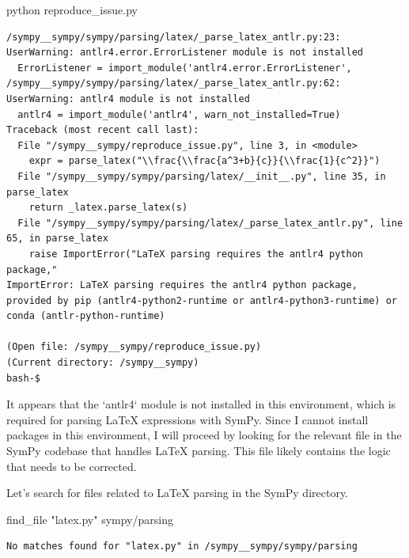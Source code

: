 {\begin{agentbox}
\hrulefill
\begin{CodeVerbatim}[breaklines=true, breakanywhere=true]
python reproduce_issue.py
\end{CodeVerbatim}
\end{agentbox}
\begin{observationbox}\begin{Verbatim}[breaklines=true, breakanywhere=true]
/sympy__sympy/sympy/parsing/latex/_parse_latex_antlr.py:23: UserWarning: antlr4.error.ErrorListener module is not installed
  ErrorListener = import_module('antlr4.error.ErrorListener',
/sympy__sympy/sympy/parsing/latex/_parse_latex_antlr.py:62: UserWarning: antlr4 module is not installed
  antlr4 = import_module('antlr4', warn_not_installed=True)
Traceback (most recent call last):
  File "/sympy__sympy/reproduce_issue.py", line 3, in <module>
    expr = parse_latex("\\frac{\\frac{a^3+b}{c}}{\\frac{1}{c^2}}")
  File "/sympy__sympy/sympy/parsing/latex/__init__.py", line 35, in parse_latex
    return _latex.parse_latex(s)
  File "/sympy__sympy/sympy/parsing/latex/_parse_latex_antlr.py", line 65, in parse_latex
    raise ImportError("LaTeX parsing requires the antlr4 python package,"
ImportError: LaTeX parsing requires the antlr4 python package, provided by pip (antlr4-python2-runtime or antlr4-python3-runtime) or conda (antlr-python-runtime)

(Open file: /sympy__sympy/reproduce_issue.py)
(Current directory: /sympy__sympy)
bash-$
\end{Verbatim}
\end{observationbox}
\begin{agentbox}
It appears that the `antlr4` module is not installed in this environment, which is required for parsing LaTeX expressions with SymPy. Since I cannot install packages in this environment, I will proceed by looking for the relevant file in the SymPy codebase that handles LaTeX parsing. This file likely contains the logic that needs to be corrected.



Let's search for files related to LaTeX parsing in the SymPy directory.

\hrulefill
\begin{CodeVerbatim}[breaklines=true, breakanywhere=true]
find_file "latex.py" sympy/parsing
\end{CodeVerbatim}
\end{agentbox}
\begin{observationbox}\begin{Verbatim}[breaklines=true, breakanywhere=true]
No matches found for "latex.py" in /sympy__sympy/sympy/parsing


\end{Verbatim}
\end{observationbox}}
